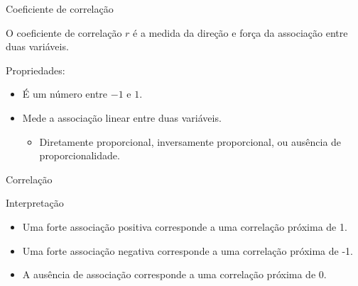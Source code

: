 \documentclass{beamer}
\begin{document}
\begin{frame}{\scriptsize Coeficiente de correlação}
  \begin{definition}
    O coeficiente de correlação $r$ é a medida da direção e força da
    associação entre duas variáveis.
  \end{definition}
  Propriedades:
  \begin{itemize}
    \footnotesize
  \item É um número entre $-1$ e $1$.
    \bigskip
  \item Mede a associação \alert{linear} entre duas variáveis.
    \begin{itemize}
      \scriptsize
    \item Diretamente proporcional, inversamente proporcional, ou
      ausência de proporcionalidade.
    \end{itemize}
  \end{itemize}
\end{frame}


\begin{frame}{\scriptsize Correlação}
  \begin{block}{Interpretação}
    \footnotesize
    \begin{itemize}
    \footnotesize
    \item Uma forte associação \alert<2>{positiva} corresponde a uma correlação
      próxima de \alert<2>{1}.
      \bigskip
    \item Uma forte associação \alert<3>{negativa} corresponde a uma correlação
      próxima de \alert<3>{-1}.
      \bigskip
    \item A \alert<4>{ausência} de associação corresponde a uma
      correlação próxima de \alert<4>{0}.
    \end{itemize}
  \end{block}
\end{frame}
\end{document}
